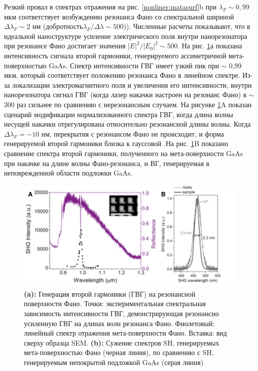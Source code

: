 Резкий провал в спектрах отражения на рис. \ref{nonliner:matasurf}b при $\lambda_{F} \sim0,99$  мкм соответствует возбуждению резонанса Фано со спектральной шириной $\Delta\lambda_{F} \sim 2$ нм (добротность$\lambda_{F} /\Delta\lambda \sim 500$)). Численные расчеты показывают, что в идеальной наноструктуре усиление электрического поля внутри нанорезонатора при резонансе Фано достигает значения $|E|^2/|E_{0}|^2 \sim 500$. На рис. \ref{nonliner:matasurf2}а показана интенсивность сигнала второй гармоники, генерируемого  ассиметричной мета-поверхностью GaAs. Спектр интенсивности ГВГ имеет узкий пик при $\sim$ 0,99 мкм, который соответствует положению резонанса Фано в линейном спектре. Из-за локализации электромагнитного поля и увеличения его интенсивности, внутри нанорезонатора сигнал ГВГ  (когда лазер накачки настроен на резонанс Фано) в  $\sim$ 300 раз сильнее по сравнению с нерезонансным случаем. На рисунке \ref{nonliner:matasurf2}A показан сценарий модификации нормализованного спектра ГВГ, когда длина волны несущей накачки отрегулирована относительно резонансной длины волны. Когда $\Delta\lambda_{F} = -10$ нм, перекрытия с резонансом Фано не происходит, и форма генерируемой второй гармоники близка к гауссовой .На рис. \ref{nonliner:matasurf2}B показано сравнение спектра второй гармоники, полученного на мета-поверхности GaAs при накачке на длине волны Фано-резонанса, и ВГ, генерируемая в неповрежденной области подложки GaAs. 
 \begin{figure}[h!]
	\centering
	\includegraphics[width=0.7\linewidth]{images/fig7.png}
	\caption{\textbf{(a): }Генерация второй гармоники (ГВГ) на резонансной поверхности Фано. Точки: экспериментальная спектральная зависимость интенсивности ГВГ, демонстрирующая резонансно усиленную ГВГ на длинах волн резонанса Фано. Фиолетовый: линейный спектр отражения мета-поверхности Фано. Вставка: вид сверху образца SEM. \textbf{(b):} Сужение спектров SH, генерируемых мета-поверхностью Фано (черная линия), по сравнению с SH, генерируемым непокрытой подложкой GaAs (серая линия) \cite{vabishchevich2018enhanced}}
	\label{nonliner:matasurf2}
\end{figure}


